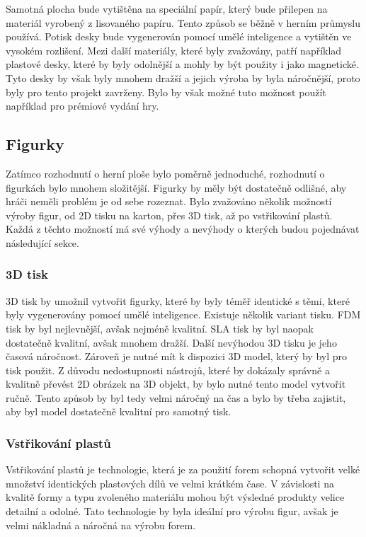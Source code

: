 Samotná plocha bude vytištěna na speciální papír, který bude přilepen na materiál vyrobený z lisovaného papíru. Tento způsob se běžně v herním průmyslu používá. Potisk desky bude vygenerován pomocí umělé inteligence a vytištěn ve vysokém rozlišení. Mezi další materiály, které byly zvažovány, patří například plastové desky, které by byly odolnější a mohly by být použity i jako magnetické. Tyto desky by však byly mnohem dražší a jejich výroba by byla náročnější, proto byly pro tento projekt zavrženy. Bylo by však možné tuto možnost použít například pro prémiové vydání hry.

\subsection{Figurky}
Zatímco rozhodnutí o herní ploše bylo poměrně jednoduché, rozhodnutí o figurkách bylo mnohem složitější. Figurky by měly být dostatečně odlišné, aby hráči neměli problém je od sebe rozeznat. Bylo zvažováno několik možností výroby figur, od 2D tisku na karton, přes 3D tisk, až po vstřikování plastů. Každá z těchto možností má své výhody a nevýhody o kterých budou pojednávat následující sekce.

\subsubsection*{3D tisk}
3D tisk by umožnil vytvořit figurky, které by byly téměř identické s těmi, které byly vygenerovány pomocí umělé inteligence. Existuje několik variant tisku. FDM tisk by byl nejlevnější, avšak nejméně kvalitní. SLA tisk by byl naopak dostatečně kvalitní, avšak mnohem dražší. Další nevýhodou 3D tisku je jeho časová náročnost. Zároveň je nutné mít k dispozici 3D model, který by byl pro tisk použit. Z důvodu nedostupnosti nástrojů, které by dokázaly správně a kvalitně převést 2D obrázek na 3D objekt, by bylo nutné tento model vytvořit ručně. Tento způsob by byl tedy velmi náročný na čas a bylo by třeba zajistit, aby byl model dostatečně kvalitní pro samotný tisk.

\subsubsection*{Vstřikování plastů}
Vstřikování plastů je technologie, která je za použití forem schopná vytvořit velké množství identických plastových dílů ve velmi krátkém čase. V závislosti na kvalitě formy a typu zvoleného materiálu mohou být výsledné produkty velice detailní a odolné. Tato technologie by byla ideální pro výrobu figur, avšak je velmi nákladná a náročná na výrobu forem.

